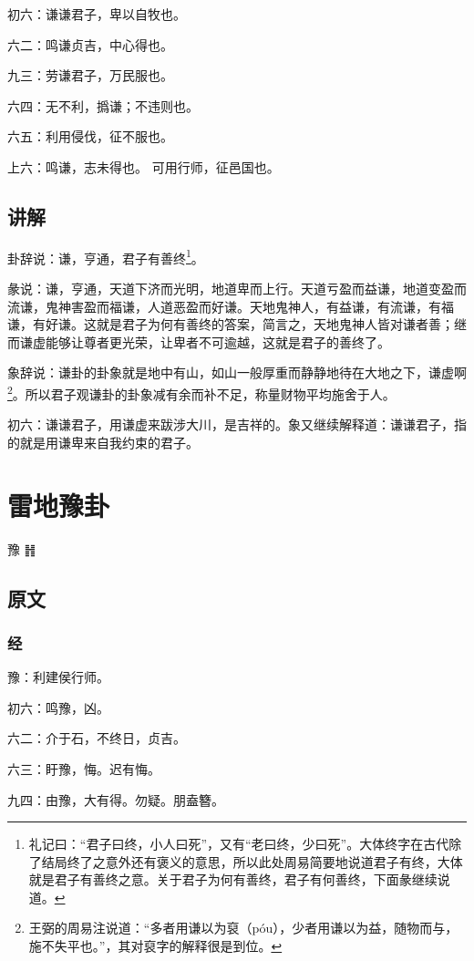 \documentclass[12pt,oneside]{book}
\begin{document}
初六：谦谦君子，卑以自牧也。

六二：鸣谦贞吉，中心得也。

九三：劳谦君子，万民服也。

六四：无不利，撝谦；不违则也。

六五：利用侵伐，征不服也。

上六：鸣谦，志未得也。 可用行师，征邑国也。

\section{讲解}
卦辞说：谦，亨通，君子有善终\footnote{礼记曰：“君子曰终，小人曰死”，又有“老曰终，少曰死”。大体终字在古代除了结局终了之意外还有褒义的意思，所以此处周易简要地说道君子有终，大体就是君子有善终之意。关于君子为何有善终，君子有何善终，下面彖继续说道。}。

彖说：谦，亨通，天道下济而光明，地道卑而上行。天道亏盈而益谦，地道变盈而流谦，鬼神害盈而福谦，人道恶盈而好谦。天地鬼神人，有益谦，有流谦，有福谦，有好谦。这就是君子为何有善终的答案，简言之，天地鬼神人皆对谦者善；继而谦虚能够让尊者更光荣，让卑者不可逾越，这就是君子的善终了。

象辞说：谦卦的卦象就是地中有山，如山一般厚重而静静地待在大地之下，谦虚啊\footnote{王弼的周易注说道：“多者用谦以为裒（póu），少者用谦以为益，随物而与，施不失平也。”，其对裒字的解释很是到位。}。所以君子观谦卦的卦象减有余而补不足，称量财物平均施舍于人。

初六：谦谦君子，用谦虚来跋涉大川，是吉祥的。象又继续解释道：谦谦君子，指的就是用谦卑来自我约束的君子。


\chapter{雷地豫卦}
豫 {\Large ䷏}

\section{原文}

\subsection{经}
豫：利建侯行师。

初六：鸣豫，凶。

六二：介于石，不终日，贞吉。

六三：盱豫，悔。迟有悔。

九四：由豫，大有得。勿疑。朋盍簪。
\end{document}
